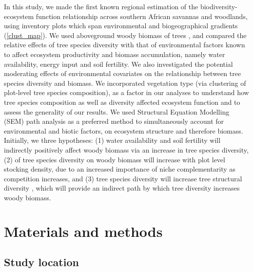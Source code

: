 \documentclass[11pt,a4paper]{article}
\begin{document}
In this study, we made the first known regional estimation of the biodiversity-ecosystem function relationship across southern African savannas and woodlands, using inventory plots which span environmental and biogeographical gradients (\autoref{clust_map}). We used aboveground woody biomass of trees , and compared the relative effects of tree species diversity with that of environmental factors known to affect ecosystem productivity and biomass accumulation, namely water availability, energy input and soil fertility. We also investigated the potential moderating effects of environmental covariates on the relationship between tree species diversity and biomass. We incorporated vegetation type (via clustering of plot-level tree species composition), as a factor in our analyses to understand how tree species composition as well as diversity affected ecosystem function and to assess the generality of our results. We used Structural Equation Modelling (SEM)  path analysis as a preferred method to simultaneously account for environmental and biotic factors,  on ecosystem structure and therefore biomass. Initially, we  three hypotheses: (1) water availability and soil fertility will indirectly positively affect woody biomass via an increase in tree species diversity, (2)  of tree species diversity on woody biomass will increase with plot level stocking density, due to an increased importance of niche complementarity as competition increases, and (3) tree species diversity will increase tree structural diversity , which will provide an indirect path by which tree diversity increases woody biomass.

\section{Materials and methods}

\subsection{Study location}
\end{document}
